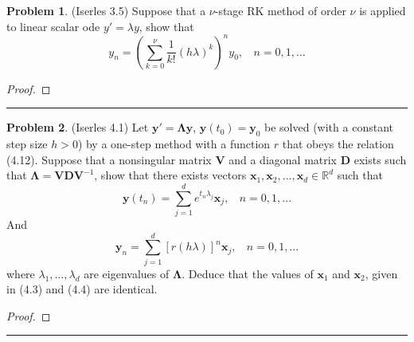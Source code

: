 \documentclass[a4paper, 10pt]{article}
\theoremstyle{definition}
\newtheorem{problem}{Problem}
\theoremstyle{hSol}
\begin{document}
\begin{problem} (Iserles 3.5) Suppose that a $\nu$-stage RK method of order $\nu$ is applied to linear scalar ode $y' = \lambda y$, show that
$$
y_n = \left(\sum_{k=0}^{\nu} \frac{1}{k!} (h \lambda)^k\right)^n y_0,~~~~n=0,1,...
$$
\end{problem}
\begin{proof} 
\end{proof} 
\noindent\rule{16cm}{0.4pt}

\begin{problem} (Iserles 4.1) Let $\bm{y}'= \bm{\Lambda} \bm{y}$, $\bm{y}(t_0)=\bm{y}_0$ be solved (with a constant step size $h>0$) by a one-step method with a function $r$ that obeys the relation (4.12). Suppose that a nonsingular matrix $\bm{V}$ and a diagonal matrix $\bm{D}$ exists such that $\bm{\Lambda} = \bm{V} \bm{D} \bm{V}^{-1}$, show that there exists vectors $\bm{x}_1, \bm{x}_2, ..., \bm{x}_d \in \mathbb{R}^d$ such that
$$
\bm{y}(t_n) = \sum_{j=1}^d e^{t_n \lambda_j} \bm{x}_j,~~~~n=0,1,...
$$
And 
$$
\bm{y}_n = \sum_{j=1}^d [r(h \lambda)]^n \bm{x}_j,~~~~n=0,1,...
$$
where $\lambda_1, ..., \lambda_d$ are eigenvalues of $\bm{\Lambda}$. Deduce that the values of $\bm{x}_1$ and $\bm{x}_2$, given in (4.3) and (4.4) are identical.
\end{problem}
\begin{proof} 
\end{proof} 
\noindent\rule{16cm}{0.4pt}
\end{document}
